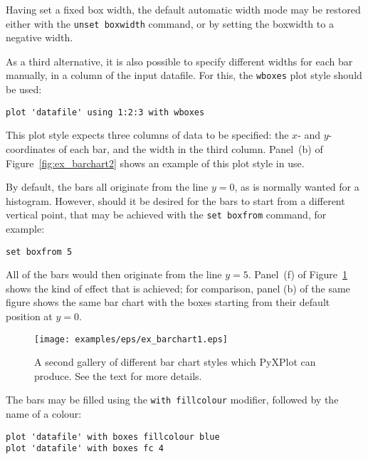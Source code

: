 \documentclass[a4paper,onecolumn,11pt]{book}
\begin{document}
Having set a fixed box width, the default automatic width mode may be restored
either with the \texttt{unset boxwidth} command, or by setting the boxwidth to
a negative width.

As a third alternative, it is also possible to specify different widths for
each bar manually, in a column of the input datafile. For this, the
\texttt{wboxes} plot style
should be used:

\begin{verbatim} 
plot 'datafile' using 1:2:3 with wboxes
\end{verbatim}

\noindent This plot style expects three columns of data to be specified: the
$x$- and $y$-coordinates of each bar, and the width in the third column.
Panel~(b) of Figure~\ref{fig:ex_barchart2} shows an example of this plot style
in use.

By default, the bars all originate from the line $y=0$, as is normally wanted
for a histogram. However, should it be desired for the bars to start from a
different vertical point, that may be achieved with the \texttt{set boxfrom}
command, for example:

\begin{verbatim} 
set boxfrom 5
\end{verbatim}

\noindent All of the bars would then originate from the line $y=5$. Panel~(f)
of Figure~\ref{fig:ex_barchart1} shows the kind of effect that is achieved; for
comparison, panel (b) of the same figure shows the same bar chart with the
boxes starting from their default position at $y=0$.

\begin{figure}
\begin{center}
\texttt{[image: examples/eps/ex\_barchart1.eps]}
\end{center}
\caption{A second gallery of different bar chart styles which PyXPlot can produce. See the text for more details.}
\label{fig:ex_barchart1}
\end{figure}

The bars may be filled using the \texttt{with fillcolour} modifier, followed by the name of a
colour:

\begin{verbatim} 
plot 'datafile' with boxes fillcolour blue
plot 'datafile' with boxes fc 4
\end{verbatim}
\end{document}
